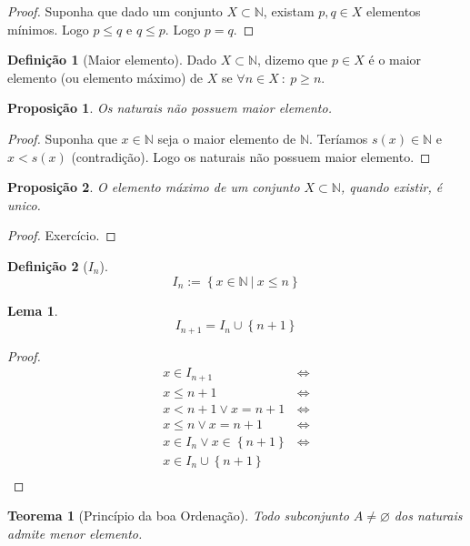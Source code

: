 \documentclass{article}
\theoremstyle{plain}
\newtheorem{prop}{Proposição}[section]
\newtheorem{teo}{Teorema}
\newtheorem{lema}{Lema}
\theoremstyle{definition}
\newtheorem{definicao}{Definição}[section]
\theoremstyle{remark}
\begin{document}
\begin{proof}
	Suponha que dado um conjunto $X\subset\mathbb{N}$,  existam $p,q\in X$ elementos mínimos. Logo $p\leq q $ e $q \leq p$. Logo $p=q$.
\end{proof}
\begin{definicao}[Maior elemento]
	Dado $X\subset \mathbb{N}$, dizemo que $p\in X$ é o maior elemento (ou elemento máximo) de $X$ se $\forall n\in X \: : \: p\geq n$.
\end{definicao}
\begin{prop}
	Os naturais não possuem maior elemento.
\end{prop}
\begin{proof}
	Suponha que $x\in \mathbb{N}$ seja o maior elemento de $\mathbb{N}$. Teríamos $s(x)\in \mathbb{N}$ e $x < s(x)$ (contradição). Logo os naturais não possuem maior elemento. 
\end{proof}
\begin{prop}
	O elemento máximo de um conjunto $X\subset \mathbb{N}$, quando existir, é unico.
\end{prop}
\begin{proof}
	Exercício.
\end{proof}
\begin{definicao}[$I_n$]
	$$I_n := \left\{ x\in \mathbb{N} \: | \:  x\leq n \right\}$$
\end{definicao}
\begin{lema}
	$$I_{n+1} = I_n \cup \left\{n+1\right\}$$
\end{lema}
\begin{proof}
	\begin{align*}
		x \in I_{n+1} &\iff \\
		x\leq n+1 &\iff \\
		x < n+1 \lor x = n+1 &\iff \\
		x \leq n \lor x = n+1 & \iff \\
		x\in I_n \lor x \in \left\{n+1\right\} & \iff \\
		x \in I_n \cup \left\{n+1\right\} \\
	\end{align*}
\end{proof}
\begin{teo}[Princípio da boa Ordenação]
	Todo subconjunto $A\neq \varnothing $ dos naturais admite menor elemento.
\end{teo}
\end{document}
